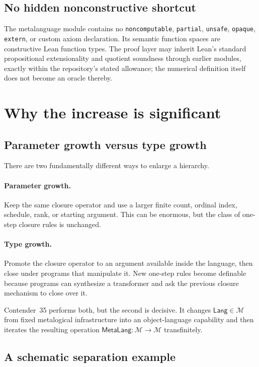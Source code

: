 \documentclass[11pt]{article}
\theoremstyle{definition}
\newcommand{\MOp}{\mathcal{M}}
\newcommand{\Lang}{\mathsf{Lang}}
\newcommand{\MetaLang}{\mathsf{MetaLang}}
\newcommand{\code}[1]{\texttt{#1}}
\begin{document}
\subsection{No hidden nonconstructive shortcut}

The metalanguage module contains no \code{noncomputable}, \code{partial},
\code{unsafe}, \code{opaque}, \code{extern}, or custom axiom declaration.  Its
semantic function spaces are constructive Lean function types.  The proof
layer may inherit Lean's standard propositional extensionality and quotient
soundness through earlier modules, exactly within the repository's stated
allowance; the numerical definition itself does not become an oracle thereby.

\section{Why the increase is significant}

\subsection{Parameter growth versus type growth}

There are two fundamentally different ways to enlarge a hierarchy.

\paragraph{Parameter growth.}
Keep the same closure operator and use a larger finite count, ordinal index,
schedule, rank, or starting argument.  This can be enormous, but the class of
one-step closure rules is unchanged.

\paragraph{Type growth.}
Promote the closure operator to an argument available inside the language,
then close under programs that manipulate it.  New one-step rules become
definable because programs can synthesize a transformer and ask the previous
closure mechanism to close over it.

Contender~35 performs both, but the second is decisive.  It changes
\(\Lang\in\MOp\) from fixed metalogical infrastructure into an object-language
capability and then iterates the resulting operation
\(\MetaLang:\MOp\to\MOp\) transfinitely.

\subsection{A schematic separation example}
\end{document}
